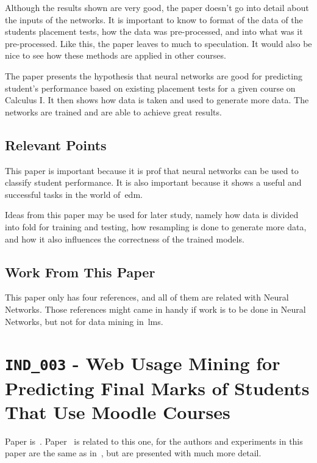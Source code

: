Although the results shown are very good, the paper doesn't go into detail
about the inputs of the networks. It is important to know to format of the data
of the students placement tests, how the data was pre-processed, and into what
was it pre-processed. Like this, the paper leaves to much to speculation. It
would also be nice to see how these methods are applied in other courses.

The paper presents the hypothesis that neural networks are good for predicting
student's performance based on existing placement tests for a given course on
Calculus I. It then shows how data is taken and used to generate more data. The
networks are trained and are able to achieve great results.

\subsection{Relevant Points}

This paper is important because it is prof that neural networks can be used to
classify student performance. It is also important because it shows a useful
and successful tasks in the world of~\gls{edm}.

Ideas from this paper may be used for later study, namely how data is divided
into fold for training and testing, how resampling is done to generate more
data, and how it also influences the correctness of the trained models.

\subsection{Work From This Paper}

This paper only has four references, and all of them are related with Neural
Networks. Those references might came in handy if work is to be done in Neural
Networks, but not for data mining in~\gls{lms}.

\section{\texttt{IND\_003} - Web Usage Mining for Predicting Final Marks of
Students That Use Moodle Courses}

Paper is~\cite{ind_003}. Paper~\cite{ind_007} is related to this one, for the
authors and experiments in this paper are the same as in~\cite{ind_007}, but
are presented with much more detail.

